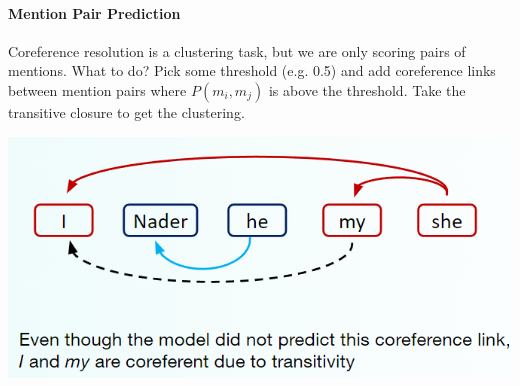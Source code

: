 \documentclass[10pt]{report}
\begin{document}
\paragraph{Mention Pair Prediction} Coreference resolution is a clustering task, but we are only scoring pairs of mentions. What to do? Pick some threshold (e.g. 0.5) and add coreference links between mention pairs where $P(m_i, m_j)$ is above the threshold. Take the transitive closure to get the clustering.
\begin{center}
	\includegraphics[scale=0.5]{111.png}
\end{center}
\end{document}
